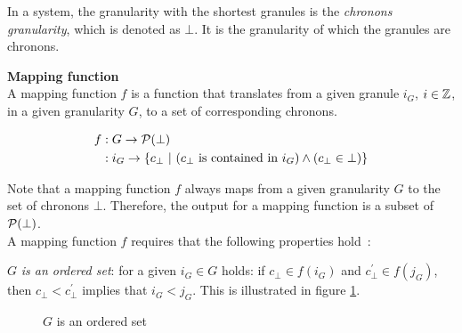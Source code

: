 

In a system, the granularity with the shortest granules is the \emph{chronons granularity}, which is denoted as $\bot$. It is the granularity of which the granules are chronons. 

\begin{svgraybox}
\begin{definition}
\label{def:mapping-function}
\textbf{Mapping function}~\cite{Lin97}\\ 
A mapping function $f$ is a function that translates from a given granule $i_G$, $i \in \mathbb{Z}$, in a given granularity $G$, to a set of corresponding chronons.\\

\vspace{-10pt}

\begin{align}
f & : G \rightarrow \mathcal{P}(\bot)\nonumber\\
  & : i_{G} \rightarrow \lbrace c_\bot\ |\ (c_\bot\text{ is contained in }i_{G}) \wedge (c_\bot \in \bot)\rbrace\nonumber
\end{align}
\end{definition}
\end{svgraybox}

Note that a mapping function $f$ always maps from a given granularity $G$ to the set of chronons $\bot$. Therefore, the output for a mapping function is a subset of $\mathcal{P}(\bot)$. \\
 A mapping function $f$ requires that the following properties hold~\cite{Lin97}:

%
%
\begin{property}
$G$ \emph{is an ordered set}: for a given $i_{G} \in G$ holds: if $c_\bot \in f(i_G)$ and $c^{'}_\bot \in f(j_G)$, then $c_\bot < c^{'}_\bot$ implies that $i_G < j_G$. This is illustrated in figure \ref{fig:granularity-prop1}.
\begin{figure}
\centering

\caption{$G$ is an ordered set}
\label{fig:granularity-prop1}
\end{figure}
\end{property}

